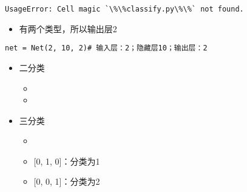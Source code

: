 \documentclass[11pt]{article}
\providecommand{\tightlist}{%
      \setlength{\itemsep}{0pt}\setlength{\parskip}{0pt}}
\begin{document}
    \begin{Verbatim}[commandchars=\\\{\}]
UsageError: Cell magic `\%\%classify.py\%\%` not found.

    \end{Verbatim}

    \begin{itemize}
\tightlist
\item
  有两个类型，所以输出层2
\end{itemize}

\texttt{net\ =\ Net(2,\ 10,\ 2)\#\ 输入层：2；隐藏层10；输出层：2}

    \begin{itemize}
\tightlist
\item
  二分类

  \begin{itemize}
  \item
  \item
  \end{itemize}
\item
  三分类

  \begin{itemize}
  \item
  \item
    {[}0, 1, 0{]}：分类为1
  \item
    {[}0, 0, 1{]}：分类为2
  \end{itemize}
\end{itemize}


    
    
    
    
\end{document}
